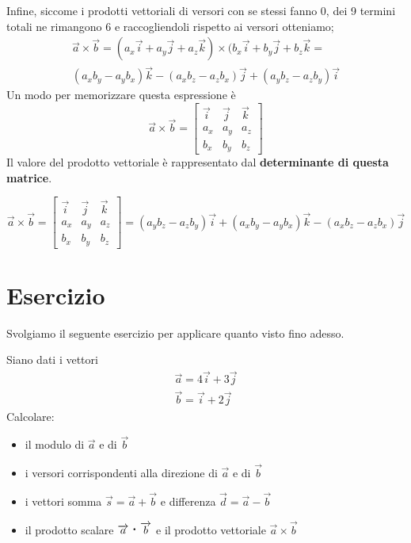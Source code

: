 \documentclass[a4paper]{book}
\newcommand{\prodscal}{\text{\large{\textbf{\textperiodcentered}}}} %
\begin{document}
Infine, siccome i prodotti vettoriali di versori con se stessi fanno 0, dei 9 termini totali ne rimangono 6 e raccogliendoli rispetto ai versori otteniamo;
\begin{align*}
\overrightarrow{a} \times \overrightarrow{b} = ( a_{x} \overrightarrow{i} + a_{y}\overrightarrow{j} + a_{z} \overrightarrow{k}  ) \times ( b_{x} \overrightarrow{i} + b_{y} \overrightarrow{j} + b_{z} \overrightarrow{k} = \\
( a_{x} b_{y} - a_{y} b_{x} ) \overrightarrow{k} - ( a_{x} b_{z} - a_{z} b_{x} ) \overrightarrow{j} + ( a_{y} b_{z} - a_{z} b_{y} ) \overrightarrow{i}
\end{align*}
Un modo per memorizzare questa espressione è
$$ \overrightarrow{a} \times \overrightarrow{b} = \begin{bmatrix}
\overrightarrow{i} & \overrightarrow{j} & \overrightarrow{k} \\
a_{x} & a_{y} & a_{z} \\
b_{x} & b_{y} & b_{z}
\end{bmatrix}  $$
Il valore del prodotto vettoriale è rappresentato dal \textbf{determinante di questa matrice}.

$$ \overrightarrow{a} \times \overrightarrow{b} = \begin{bmatrix}
\overrightarrow{i} & \overrightarrow{j} & \overrightarrow{k} \\
a_{x} & a_{y} & a_{z} \\
b_{x} & b_{y} & b_{z}
\end{bmatrix}  
= ( a_{y} b_{z} - a_{z} b_{y} ) \overrightarrow{i} + ( a_{x} b_{y} - a_{y} b_{x} ) \overrightarrow{k} - ( a_{x} b_{z} - a_{z} b_{x} ) \overrightarrow{j}  $$

\section{Esercizio}
Svolgiamo il seguente esercizio per applicare quanto visto fino adesso.

Siano dati i vettori
\begin{align*}
\overrightarrow{a} = 4 \overrightarrow{i} + 3 \overrightarrow{j} \\
\overrightarrow{b} = \overrightarrow{i} + 2 \overrightarrow{j}
\end{align*}
Calcolare:
\begin{itemize}
\item il modulo di $ \overrightarrow{a} $ e di $ \overrightarrow{b} $
\item i versori corrispondenti alla direzione di $ \overrightarrow{a} $ e di $\overrightarrow{b} $
\item i vettori somma $ \overrightarrow{s} = \overrightarrow{a} + \overrightarrow{b} $ e differenza $ \overrightarrow{d} = \overrightarrow{a} - \overrightarrow{b} $
\item il prodotto scalare $ \overrightarrow{a} \prodscal \overrightarrow{b} $ e il prodotto vettoriale $ \overrightarrow{a} \times \overrightarrow{b} $
\end{itemize}
\end{document}

